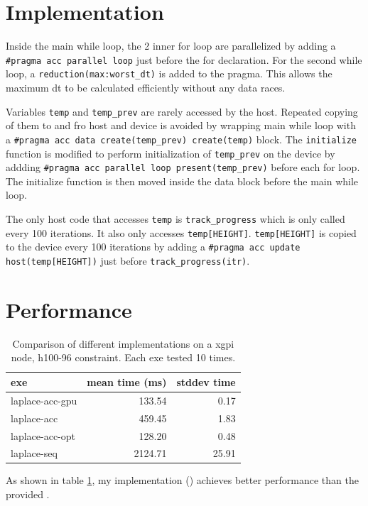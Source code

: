 \documentclass{article}
\begin{document}
\section{Implementation}
Inside the main while loop,
the 2 inner for loop are parallelized by adding a \texttt{\#pragma acc parallel loop} just before the for declaration.
For the second while loop, a \texttt{reduction(max:worst\_dt)} is added to the pragma.
This allows the maximum dt to be calculated efficiently without any data races.

Variables \texttt{temp} and \texttt{temp\_prev} are rarely accessed by the host.
Repeated copying of them to and fro host and device is avoided by wrapping main while loop with a
\texttt{\#pragma acc data create(temp\_prev) create(temp)} block.
The \texttt{initialize} function is modified to perform initialization of \texttt{temp\_prev} on the device by addding
\texttt{\#pragma acc parallel loop present(temp\_prev)} before each for loop.
The initialize function is then moved inside the data block before the main while loop.

The only host code that accesses \texttt{temp} is \texttt{track\_progress} which is only called every 100 iterations.
It also only accesses \texttt{temp[HEIGHT]}.
\texttt{temp[HEIGHT]} is copied to the device every 100 iterations by adding a
\texttt{\#pragma acc update host(temp[HEIGHT])} just before \texttt{track\_progress(itr)}.

\section{Performance}
\begin{table}[H]
\centering
\begin{tabular}{@{}lrr@{}}
\toprule
exe             & mean time (ms) & stddev time \\ \midrule
laplace-acc-gpu & 133.54         & 0.17        \\
laplace-acc     & 459.45         & 1.83        \\
laplace-acc-opt & 128.20         & 0.48        \\
laplace-seq     & 2124.71        & 25.91       \\ \bottomrule
\end{tabular}
\caption{Comparison of different implementations on a xgpi node, h100-96 constraint. Each exe tested 10 times.}
\label{tab:tab-1}
\end{table}

As shown in table \ref{tab:tab-1},
my implementation () achieves better performance than the provided . 
\end{document}
